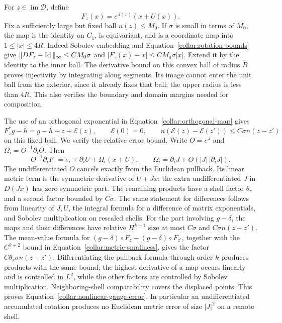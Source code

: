 For \(z\in\operatorname{im}\mathcal D\), define
\begin{equation}
 F_z(x)=e^{J(x)}(x+U(x)).
 \label{collar:orthogonal-map}
\end{equation}
Fix a sufficiently large but fixed ball \(n(z)\le M_0\).
If \(\sigma\) is small in terms of \(M_0\), the map is the identity
on \(C_1\), is equivariant, and is a coordinate map into
\(1\le|x|\le4R\).  Indeed Sobolev embedding and
Equation~\eqref{collar:rotation-bounds} give
\(\|DF_z-\operatorname{Id}\|_\infty\le C M_0\sigma\) and
\(|F_z(x)-x|\le C M_0\sigma|x|\).
Extend it by the identity to the inner ball.  The derivative bound
on this convex ball of radius \(R\) proves injectivity by
integrating along segments.  Its image cannot enter the unit ball
from the exterior, since it already fixes that ball; the upper
radius is less than \(4R\).  This also verifies the boundary and
domain margins needed for composition.

The use of an orthogonal exponential in
Equation~\eqref{collar:orthogonal-map} gives
\begin{equation}
 F_z^*g-\bar h=g-\bar h+z+\mathcal E(z),\qquad
 \mathcal E(0)=0,
 \qquad
 n(\mathcal E(z)-\mathcal E(z'))\le C\sigma n(z-z')
 \label{collar:nonlinear-gauge-error}
\end{equation}
on this fixed ball.  We verify the relative error bound.  Write
\(O=e^J\) and \(\Omega_i=O^{-1}\partial_iO\).  Then
\[
 O^{-1}\partial_iF_z=e_i+\partial_iU+\Omega_i(x+U),
 \qquad \Omega_i=\partial_iJ+O(|J|\,|\partial_iJ|).
\]
The undifferentiated \(O\) cancels exactly from the Euclidean
pullback.  Its linear metric term is the symmetric derivative of
\(U+Jx\): the extra undifferentiated \(J\) in \(D(Jx)\) has zero
symmetric part.  The remaining products have a shell factor
\(\theta_r\) and a second factor bounded by \(C\sigma\).
The same statement for differences follows from linearity of
\(J,U\), the integral formula for a difference of matrix
exponentials, and Sobolev multiplication on rescaled shells.
For the part involving \(g-\delta\), the maps and their
differences have relative \(H^{k+1}\) size at most
\(C\sigma\) and \(C\sigma n(z-z')\).  The mean-value formula
for \((g-\delta)\circ F_z-(g-\delta)\circ F_{z'}\), together
with the \(C^{k+2}\) bound in
Equation~\eqref{collar:metric-smallness}, gives the factor
\(C\theta_r\sigma n(z-z')\).  Differentiating the pullback
formula through order \(k\) produces products with the same
bound; the highest derivative of a map occurs linearly and is
controlled in \(L^2\), while the other factors are controlled by
Sobolev multiplication.  Neighboring-shell comparability covers
the displaced points.  This proves
Equation~\eqref{collar:nonlinear-gauge-error}.  In particular an
undifferentiated accumulated rotation produces no Euclidean metric
error of size \(|J|^2\) on a remote shell.

